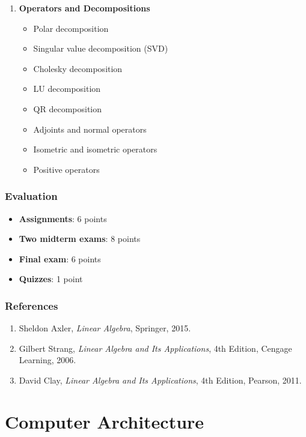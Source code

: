 \documentclass[12pt]{article}
\begin{document}
\begin{enumerate}
    \item \textbf{Operators and Decompositions}
        \begin{itemize}
            \item Polar decomposition
            \item Singular value decomposition (SVD)
            \item Cholesky decomposition
            \item LU decomposition
            \item QR decomposition
            \item Adjoints and normal operators
            \item Isometric and isometric operators
            \item Positive operators
        \end{itemize}
\end{enumerate}

\subsubsection*{Evaluation}
\begin{itemize}
    \item \textbf{Assignments}: 6 points
    \item \textbf{Two midterm exams}: 8 points
    \item \textbf{Final exam}: 6 points
    \item \textbf{Quizzes}: 1 point
\end{itemize}

\subsubsection*{References}
\begin{enumerate}
    \item Sheldon Axler, \textit{Linear Algebra}, Springer, 2015.
    \item Gilbert Strang, \textit{Linear Algebra and Its Applications}, 4th Edition, Cengage Learning, 2006.
    \item David Clay, \textit{Linear Algebra and Its Applications}, 4th Edition, Pearson, 2011.
\end{enumerate}

\newpage

\section{Computer Architecture}
\end{document}
